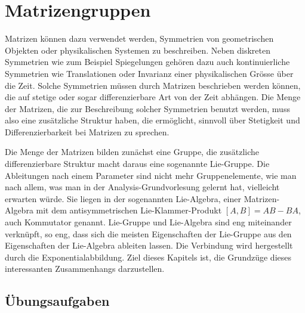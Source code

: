 %
%
%
\chapter{Matrizengruppen
\label{buch:chapter:matrizengruppen}}
\rhead{}
Matrizen können dazu verwendet werden, Symmetrien von geometrischen Objekten
oder physikalischen Systemen zu beschreiben.
%
%
Neben diskreten Symmetrien wie zum Beispiel Spiegelungen gehören dazu
%
%
%
auch kontinuierliche Symmetrien wie Translationen oder Invarianz einer
%
%
%
physikalischen Grösse über die Zeit.
Solche Symmetrien müssen durch Matrizen beschrieben werden können,
die auf stetige oder sogar differenzierbare Art von der Zeit abhängen.
Die Menge der Matrizen, die zur Beschreibung solcher Symmetrien benutzt
werden, muss also eine zusätzliche Struktur haben, die ermöglicht, 
sinnvoll über Stetigkeit und Differenzierbarkeit bei Matrizen
%
%
zu sprechen.

Die Menge der Matrizen bilden zunächst eine Gruppe,
die zusätzliche differenzierbare Struktur macht daraus
eine sogenannte Lie-Gruppe.
%
Die Ableitungen nach einem Parameter sind nicht mehr Gruppenelemente,
wie man nach allem, was man in der Analysis-Grundvorlesung
gelernt hat, vielleicht erwarten würde.
Sie liegen in der sogenannten Lie-Algebra,
einer Matrizen-Algebra mit dem antisymmetrischen
%
%
Lie-Klammer-Produkt $[A,B]=AB-BA$, auch Kommutator genannt.
%
%
Lie-Gruppe und Lie-Algebra sind eng miteinander verknüpft,
so eng, dass sich die meisten Eigenschaften der Lie-Gruppe aus den
Eigenschaften der Lie-Algebra ableiten lassen.
Die Verbindung wird hergestellt durch die Exponentialabbildung.
Ziel dieses Kapitels ist, die Grundzüge dieses interessanten 
Zusammenhangs darzustellen.




%

\section*{Übungsaufgaben}
\begin{uebungsaufgaben}
\end{uebungsaufgaben}

